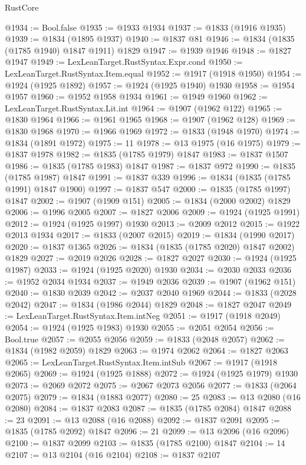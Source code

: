 \begin{lexlean}{RustCore}
\begin{coremodule}
@1934 := Bool.false
@1935 := @1933 @1934
@1937 := @1833 (@1916 @1935)
@1939 := @1834 (@1895 @1937)
@1940 := @1837 @81
@1946 := @1834 (@1835 (@1785 @1940) @1847 @1911) @1829
@1947 := @1939 @1946
@1948 := @1827 @1947
@1949 := LexLeanTarget.RustSyntax.Expr.cond
@1950 := LexLeanTarget.RustSyntax.Item.equal
@1952 := @1917 (@1918 @1950)
@1954 := @1924 (@1925 @1892)
@1957 := @1924 (@1925 @1940) @1930
@1958 := @1954 @1957
@1960 := @1952 @1958 @1934
@1961 := @1949 @1960
@1962 := LexLeanTarget.RustSyntax.Lit.int
@1964 := @1907 (@1962 @122)
@1965 := @1830 @1964
@1966 := @1961 @1965
@1968 := @1907 (@1962 @128)
@1969 := @1830 @1968
@1970 := @1966 @1969
@1972 := @1833 (@1948 @1970)
@1974 := @1834 (@1891 @1972)
@1975 := 11
@1978 := @13 @1975 (@16 @1975)
@1979 := @1837 @1978
@1982 := @1835 (@1785 @1979) @1847
@1983 := @1837 @1507
@1986 := @1835 (@1785 @1983) @1847
@1987 := @1837 @972
@1990 := @1835 (@1785 @1987) @1847
@1991 := @1837 @339
@1996 := @1834 (@1835 (@1785 @1991) @1847 @1900)
@1997 := @1837 @547
@2000 := @1835 (@1785 @1997) @1847
@2002 := @1907 (@1909 @151)
@2005 := @1834 (@2000 @2002) @1829
@2006 := @1996 @2005
@2007 := @1827 @2006
@2009 := @1924 (@1925 @1991)
@2012 := @1924 (@1925 @1997) @1930
@2013 := @2009 @2012
@2015 := @1922 @2013 @1934
@2017 := @1833 (@2007 @2015)
@2019 := @1834 (@1990 @2017)
@2020 := @1837 @1365
@2026 := @1834 (@1835 (@1785 @2020) @1847 @2002) @1829
@2027 := @2019 @2026
@2028 := @1827 @2027
@2030 := @1924 (@1925 @1987)
@2033 := @1924 (@1925 @2020) @1930
@2034 := @2030 @2033
@2036 := @1952 @2034 @1934
@2037 := @1949 @2036
@2039 := @1907 (@1962 @151)
@2040 := @1830 @2039
@2042 := @2037 @2040 @1969
@2044 := @1833 (@2028 @2042)
@2047 := @1834 (@1986 @2044) @1829
@2048 := @1827 @2047
@2049 := LexLeanTarget.RustSyntax.Item.intNeg
@2051 := @1917 (@1918 @2049)
@2054 := @1924 (@1925 @1983) @1930
@2055 := @2051 @2054
@2056 := Bool.true
@2057 := @2055 @2056
@2059 := @1833 (@2048 @2057)
@2062 := @1834 (@1982 @2059) @1829
@2063 := @1974 @2062
@2064 := @1827 @2063
@2065 := LexLeanTarget.RustSyntax.Item.intSub
@2067 := @1917 (@1918 @2065)
@2069 := @1924 (@1925 @1888)
@2072 := @1924 (@1925 @1979) @1930
@2073 := @2069 @2072
@2075 := @2067 @2073 @2056
@2077 := @1833 (@2064 @2075)
@2079 := @1834 (@1883 @2077)
@2080 := 25
@2083 := @13 @2080 (@16 @2080)
@2084 := @1837 @2083
@2087 := @1835 (@1785 @2084) @1847
@2088 := 23
@2091 := @13 @2088 (@16 @2088)
@2092 := @1837 @2091
@2095 := @1835 (@1785 @2092) @1847
@2096 := 21
@2099 := @13 @2096 (@16 @2096)
@2100 := @1837 @2099
@2103 := @1835 (@1785 @2100) @1847
@2104 := 14
@2107 := @13 @2104 (@16 @2104)
@2108 := @1837 @2107

\end{coremodule}
\end{lexlean}
